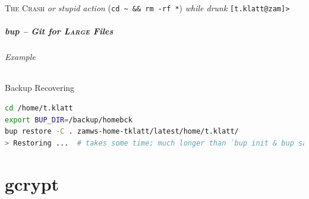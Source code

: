 \documentclass[english,hyperref={pdfpagelabels=false},aspectratio=169]{beamer}
\begin{document}
{
\begin{frame}
  \centering
  \color{white}
  {\Huge \textsc{The Crash}}
  \vfill
  {\tiny\emph{or stupid action} {\color{fzjgray50}(\texttt{cd \textasciitilde~\&\& rm -rf *})} \emph{while drunk}}
  \vfill
  \color{green}
  \texttt{[t.klatt@zam]>\textunderscore}
\end{frame}
}

\begin{frame}[fragile]
  \frametitle{bup -- Git for \textsc{Large} Files}
  \framesubtitle{Example}
  \begin{block}{Backup Recovering}
    \vspace{-0.75em}
    \begin{lstlisting}[language=zsh]
cd /home/t.klatt
export BUP_DIR=/backup/homebck
bup restore -C . zamws-home-tklatt/latest/home/t.klatt/
> Restoring ...  # takes some time; much longer than `bup init & bup save`
    \end{lstlisting}
    \vspace{-0.75em}
  \end{block}
\end{frame}



\part{gcrypt}
\makepart
\end{document}
